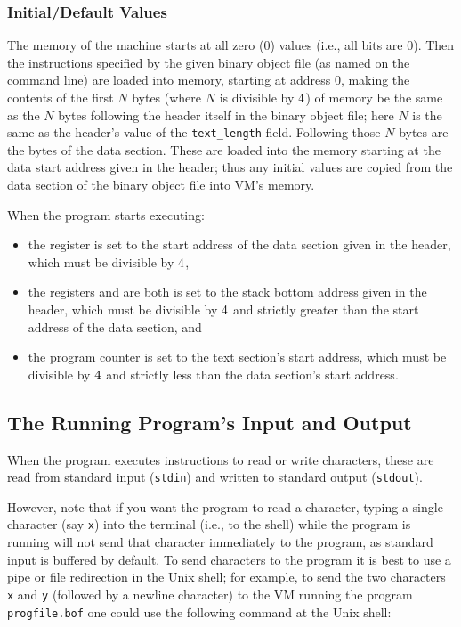 \documentclass[11pt,letterpaper]{article}
\begin{document}
\subsubsection{Initial/Default Values}
\label{sec:initial}

The memory of the machine starts at all zero ($0$) values (i.e., all
bits are $0$).
Then the instructions specified by the given binary object file
(as named on the command line) are loaded into memory,
starting at address $0$, making the contents of the first $N$ bytes
(where $N$ is divisible by $4$) 
of memory be the same as the $N$ bytes following the header itself in
the binary object file; here $N$ is the same as the header's value of
the \lstinline!text_length! field.
Following those $N$ bytes are the bytes of the data section.
These are loaded into the memory starting at the data start address
given in the header; thus any initial values are copied from the
data section of the binary object file into VM's memory.

When the program starts executing:
\begin{itemize}
\item
the register {\GP} is set to the start address of the data section
given in the header,
which must be divisible by $4$,

\item
the registers {\FP} and {\SP} are both is set to the stack bottom
address given in the header, which must be divisible by $4$
and strictly greater than the start address of the data section, and

\item
the program counter {\PC} is set to the text section's start address,
which must be divisible by $4$ and strictly less than the
data section's start address.
\end{itemize}


\subsection{The Running Program's Input and Output}

When the program executes instructions to read or write characters,
these are read from standard input (\texttt{stdin}) and written to
standard output (\texttt{stdout}).

However, note that if you want the program to read a character, typing a single
character (say \texttt{x}) into the terminal (i.e., to the shell) 
while the program is running will not send that character immediately
to the program, as standard input is buffered by default.  To send
characters to the program it is best to use a pipe or file redirection
in the Unix shell; for example, to send the two characters \texttt{x}
and \texttt{y} (followed by a newline character)
to the VM running the program \texttt{progfile.bof} one
could use the following command at the Unix shell:
\end{document}
